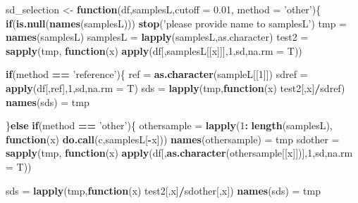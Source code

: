 \documentclass[]{article}
\newenvironment{Shaded}{\begin{snugshade}}{\end{snugshade}}
\newcommand{\ControlFlowTok}[1]{\textcolor[rgb]{0.13,0.29,0.53}{\textbf{#1}}}
\newcommand{\DataTypeTok}[1]{\textcolor[rgb]{0.13,0.29,0.53}{#1}}
\newcommand{\DecValTok}[1]{\textcolor[rgb]{0.00,0.00,0.81}{#1}}
\newcommand{\FloatTok}[1]{\textcolor[rgb]{0.00,0.00,0.81}{#1}}
\newcommand{\KeywordTok}[1]{\textcolor[rgb]{0.13,0.29,0.53}{\textbf{#1}}}
\newcommand{\NormalTok}[1]{#1}
\newcommand{\OperatorTok}[1]{\textcolor[rgb]{0.81,0.36,0.00}{\textbf{#1}}}
\newcommand{\StringTok}[1]{\textcolor[rgb]{0.31,0.60,0.02}{#1}}
\begin{document}
\begin{Shaded}
\begin{Highlighting}[]
\NormalTok{sd_selection <-}\StringTok{ }\ControlFlowTok{function}\NormalTok{(df,samplesL,}\DataTypeTok{cutoff =} \FloatTok{0.01}\NormalTok{, }\DataTypeTok{method =} \StringTok{'other'}\NormalTok{)\{}
  \ControlFlowTok{if}\NormalTok{(}\KeywordTok{is.null}\NormalTok{(}\KeywordTok{names}\NormalTok{(samplesL))) }\KeywordTok{stop}\NormalTok{(}\StringTok{'please provide name to samplesL'}\NormalTok{)}
\NormalTok{  tmp =}\StringTok{ }\KeywordTok{names}\NormalTok{(samplesL)}
\NormalTok{  samplesL =}\StringTok{ }\KeywordTok{lapply}\NormalTok{(samplesL,as.character)}
\NormalTok{  test2 =}\StringTok{ }\KeywordTok{sapply}\NormalTok{(tmp, }\ControlFlowTok{function}\NormalTok{(x) }\KeywordTok{apply}\NormalTok{(df[,samplesL[[x]]],}\DecValTok{1}\NormalTok{,sd,}\DataTypeTok{na.rm =}\NormalTok{ T))}

  \ControlFlowTok{if}\NormalTok{(method }\OperatorTok{==}\StringTok{ 'reference'}\NormalTok{)\{}
\NormalTok{    ref =}\StringTok{ }\KeywordTok{as.character}\NormalTok{(sampleL[[}\DecValTok{1}\NormalTok{]])}
\NormalTok{    sdref =}\StringTok{ }\KeywordTok{apply}\NormalTok{(df[,ref],}\DecValTok{1}\NormalTok{,sd,}\DataTypeTok{na.rm =}\NormalTok{ T)}
\NormalTok{    sds =}\StringTok{ }\KeywordTok{lapply}\NormalTok{(tmp,}\ControlFlowTok{function}\NormalTok{(x) test2[,x]}\OperatorTok{/}\NormalTok{sdref)}
    \KeywordTok{names}\NormalTok{(sds) =}\StringTok{ }\NormalTok{tmp}

\NormalTok{  \}}\ControlFlowTok{else} \ControlFlowTok{if}\NormalTok{(method }\OperatorTok{==}\StringTok{ 'other'}\NormalTok{)\{}
\NormalTok{    othersample =}\StringTok{ }\KeywordTok{lapply}\NormalTok{(}\DecValTok{1}\OperatorTok{:}\StringTok{ }\KeywordTok{length}\NormalTok{(samplesL), }\ControlFlowTok{function}\NormalTok{(x) }\KeywordTok{do.call}\NormalTok{(c,samplesL[}\OperatorTok{-}\NormalTok{x]))}
    \KeywordTok{names}\NormalTok{(othersample) =}\StringTok{ }\NormalTok{tmp}
\NormalTok{    sdother =}\StringTok{ }\KeywordTok{sapply}\NormalTok{(tmp, }\ControlFlowTok{function}\NormalTok{(x) }\KeywordTok{apply}\NormalTok{(df[,}\KeywordTok{as.character}\NormalTok{(othersample[[x]])],}\DecValTok{1}\NormalTok{,sd,}\DataTypeTok{na.rm =}\NormalTok{ T))}

\NormalTok{    sds =}\StringTok{ }\KeywordTok{lapply}\NormalTok{(tmp,}\ControlFlowTok{function}\NormalTok{(x) test2[,x]}\OperatorTok{/}\NormalTok{sdother[,x])}
    \KeywordTok{names}\NormalTok{(sds) =}\StringTok{ }\NormalTok{tmp}


\end{Highlighting}
\end{Shaded}
\end{document}
